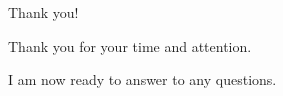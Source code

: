 \begin{frame}{Thank you!}
    
    \begin{center}
    Thank you for your time and attention.
    \end{center}

    \begin{center}
        I am now ready to answer to any questions.
    \end{center}
    
\end{frame}